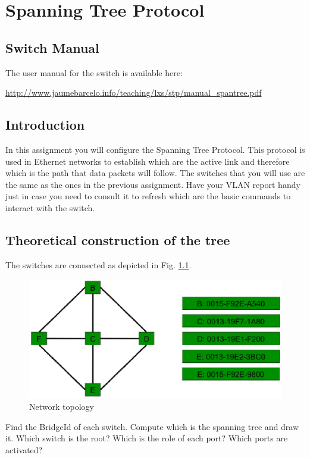 \chapter{Spanning Tree Protocol}

\section{Switch Manual}
The user manual for the switch is available here:



\url{http://www.jaumebarcelo.info/teaching/lxs/stp/manual_spantree.pdf}


\section{Introduction}

In this assignment you will configure the Spanning Tree Protocol.
This protocol is used in Ethernet networks to establish which are the active link and therefore which is the path that data packets will follow.
The switches that you will use are the same as the ones in the previous assignment.
Have your VLAN report handy just in case you need to consult it to refresh which are the basic commands to interact with the switch.

\section{Theoretical construction of the tree}
The switches are connected as depicted in Fig. \ref{fig:stp_topology}.
\begin{figure}[htbp]
  \centering
  \includegraphics[width=0.8\linewidth]{figures/stp_topology.eps}
  \caption{Network topology}
  \label{fig:stp_topology}
\end{figure}

Find the BridgeId of each switch.
Compute which is the spanning tree and draw it.
Which switch is the root?
Which is the role of each port?
Which ports are activated?

